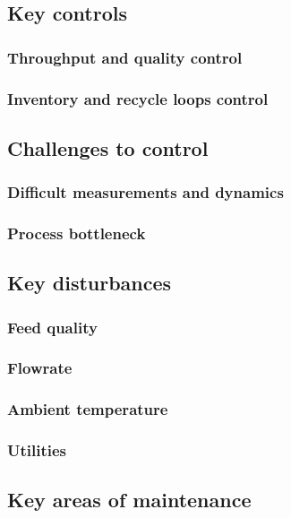 \subsection{Key controls}

\subsubsection{Throughput and quality control}


\subsubsection{Inventory and recycle loops control}




\subsection{Challenges to control}

\subsubsection{Difficult measurements and dynamics} %

\subsubsection{Process bottleneck} %



\subsection{Key disturbances} %

\subsubsection{Feed quality}

\subsubsection{Flowrate}

\subsubsection{Ambient temperature}

\subsubsection{Utilities}


\subsection{Key areas of maintenance} %